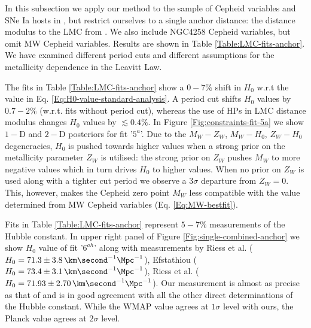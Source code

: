 In this subsection we apply our method to the sample of Cepheid variables and SNe Ia hosts in \cite{Riess:2011yx}, but restrict ourselves to a single anchor distance: the distance modulus to the LMC from \cite{Pietrzynski:2013gia}. We also include NGC4258 Cepheid variables, but omit MW Cepheid variables. Results are shown in Table \ref{Table:LMC-fits-anchor}. We have examined different period cuts and different assumptions for the metallicity dependence in the Leavitt Law.

The fits in Table \ref{Table:LMC-fits-anchor} show a $0-7\%$ shift in $H_0$ w.r.t the value in Eq. \eqref{Eq:H0-value-standard-analysis}. A period cut shifts $H_0$ values by $0.7-2\%$ (w.r.t. fits without period cut), whereas the use of HPs in LMC distance modulus changes $H_0$ values by $\lesssim 0.4\%$. In Figure \ref{Fig:constraints-fit-5a} we show $1-$D and $2-$D posteriors for fit '$5^a$'. Due to the $M_W-Z_W$, $M_W-H_0$, $Z_W-H_0$ degeneracies, $H_0$ is pushed towards higher values when a strong prior on the metallicity parameter $Z_W$ is utilised: the strong prior on $Z_W$ pushes $M_W$ to more negative values which in turn drives $H_0$ to higher values. When no prior on $Z_W$ is used along with a tighter cut period we observe a $3\sigma$ departure from $Z_W=0$. This, however, makes the Cepheid zero point $M_W$ less compatible with the value determined from MW Cepheid variables (Eq. \eqref{Eq:MW-bestfit}).

Fits in Table \ref{Table:LMC-fits-anchor} represent  $5-7\%$ measurements of the Hubble constant. In upper right panel of Figure \ref{Fig:single-combined-anchor} we show $H_0$ value of fit '$6^{ah}$' along with measurements by Riess et al. \cite{Riess:2011yx} ($H_0=71.3\pm 3.8 \, \km \second^{-1} \Mpc^{-1}$), Efstathiou \cite{Efstathiou:2013via} ($H_0 = 73.4 \pm 3.1 \, \km \second^{-1} \Mpc^{-1}$), Riess et al. \cite{Riess:2016jrr} ($H_0=71.93\pm 2.70 \, \km \second^{-1} \Mpc^{-1}$). Our measurement is almost as precise as that of \cite{Riess:2011yx} and is in good agreement with all the other direct determinations of the Hubble constant. While the WMAP value agrees at $1\sigma$ level with ours, the Planck value agrees at $2\sigma$ level.

